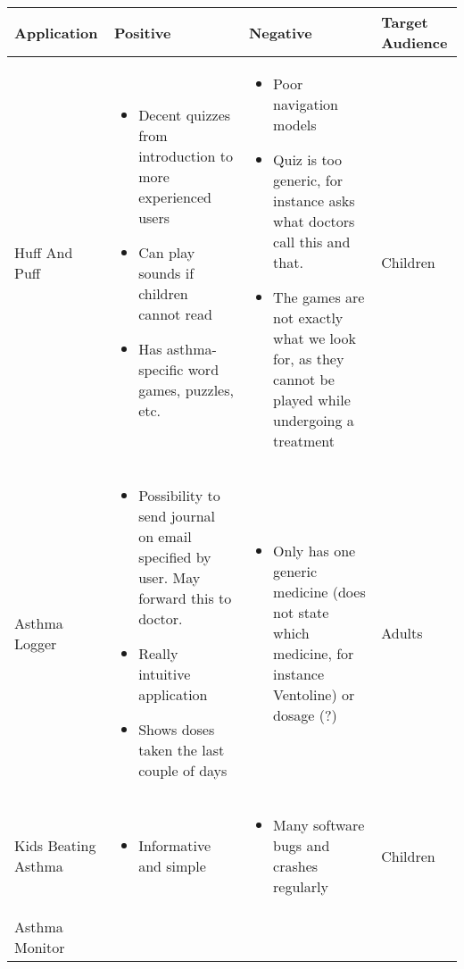 \begin{sidewaystable}
	\label{tab:existing-product-table}
	\begin{tabular}{ | p{4.0cm} | p{5.5cm} | p{5.5cm} | p{4cm}|}
	\hline
	\textbf{Application} & \textbf{Positive} & \textbf{Negative} & \textbf{Target Audience} \\ \hline
	
   Huff And Puff 
	& 
	\begin{itemize}
	  \item Decent quizzes from introduction to more experienced users
	  \item Can play sounds if children cannot read
	  \item Has asthma-specific word games, puzzles, etc.  
	\end{itemize}
	&
	\begin{itemize}
	  \item Poor navigation models
	  \item Quiz is too generic, for instance asks what doctors call this and that.
	  \item The games are not exactly what we look for, as they cannot be played while undergoing a treatment  
	\end{itemize}
	&
	Children
	\\ \hline
	Asthma Logger
	& 
	\begin{itemize}
	  \item Possibility to send journal on email specified by user. May forward this to doctor.  
	  \item Really intuitive application
	  \item Shows doses taken the last couple of days
	\end{itemize}
	& 
	\begin{itemize}
	  \item Only has one generic medicine (does not state which medicine, for instance Ventoline) or dosage (?) 
	\end{itemize}
	& 
	Adults
	\\ \hline
	Kids Beating Asthma
	& 
	\begin{itemize}
	  \item Informative and simple
	\end{itemize}
	&
	\begin{itemize}
	  \item Many software bugs and crashes regularly
	\end{itemize}
	& Children
	\\ \hline
	Asthma Monitor
	&
	\begin{itemize}

\end{itemize}
\end{tabular}
\end{sidewaystable}
